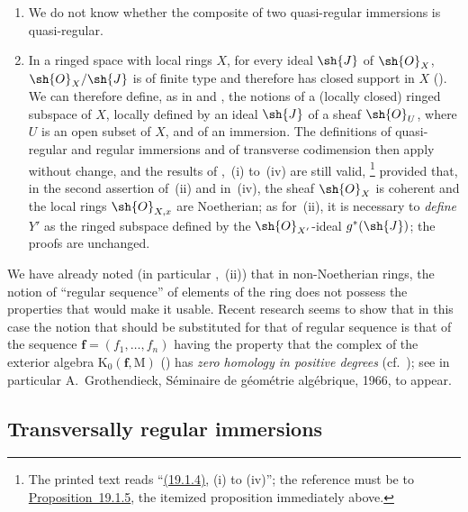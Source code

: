 \begin{remarks}[19.1.7]
\label{IV.19.1.7}
\medskip\noindent
\begin{enumerate}[label=(\roman*)]
  \item We do not know whether the composite of two quasi-regular immersions is quasi-regular.
  \item In a ringed space with local rings $X$, for every ideal $\sh{J}$ of $\sh{O}_X$, $\sh{O}_X/\sh{J}$ is of finite type and therefore has closed support in $X$ ().
We can therefore define, as in  and , the notions of a (locally closed) ringed subspace of $X$, locally defined by an ideal $\sh{J}$ of a sheaf $\sh{O}_U$, where $U$ is an open subset of $X$, and of an immersion.
The definitions of quasi-regular and regular immersions and of transverse codimension then apply without change, and the results of ,~(i) to~(iv) are still valid,
\footnote{The printed text reads ``{\hyperlink{ega4.c04.prop.19-1-4}{(19.1.4)}}, (i) to (iv)''; the reference must be to {\hyperlink{ega4.c04.prop.19-1-5}{Proposition~19.1.5}}, the itemized proposition immediately above.}
provided that, in the second assertion of~(ii) and in~(iv), the sheaf $\sh{O}_X$ is coherent and the local rings $\sh{O}_{X,x}$ are Noetherian; as for~(ii), it is necessary to \emph{define} $Y'$ as the ringed subspace defined by the $\sh{O}_{X'}$-ideal $g^*(\sh{J})$; the proofs are unchanged.
\end{enumerate}
\end{remarks}

\begin{env}[19.1.8]
\label{IV.19.1.8}
We have already noted (in particular ,~(ii)) that in non-Noetherian rings, the notion of ``regular sequence'' of elements of the ring does not possess the properties that would make it usable.
Recent research seems to show that in this case the notion that should be substituted for that of regular sequence is that of the sequence $\mathbf{f}=(f_1,\ldots,f_n)$ having the property that the complex of the exterior algebra $\mathrm{K}_0(\mathbf{f},\mathrm{M})$ () has \emph{zero homology in positive degrees} (cf.\ ); see in particular A.~Grothendieck, S\'eminaire de g\'eom\'etrie alg\'ebrique, 1966, to appear.
\end{env}

\subsection{Transversally regular immersions}
\label{subsection:IV.19.2}

